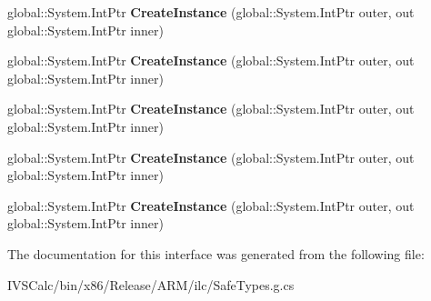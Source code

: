 \begin{DoxyCompactItemize}
\item 
\mbox{\label{interface_windows_1_1_u_i_1_1_xaml_1_1_media_1_1_animation_1_1_i_navigation_transition_info_factory_a81a98b08b53546f7b53286e123735d18}} 
global\+::\+System.\+Int\+Ptr {\bfseries Create\+Instance} (global\+::\+System.\+Int\+Ptr outer, out global\+::\+System.\+Int\+Ptr inner)
\item 
\mbox{\label{interface_windows_1_1_u_i_1_1_xaml_1_1_media_1_1_animation_1_1_i_navigation_transition_info_factory_a81a98b08b53546f7b53286e123735d18}} 
global\+::\+System.\+Int\+Ptr {\bfseries Create\+Instance} (global\+::\+System.\+Int\+Ptr outer, out global\+::\+System.\+Int\+Ptr inner)
\item 
\mbox{\label{interface_windows_1_1_u_i_1_1_xaml_1_1_media_1_1_animation_1_1_i_navigation_transition_info_factory_a81a98b08b53546f7b53286e123735d18}} 
global\+::\+System.\+Int\+Ptr {\bfseries Create\+Instance} (global\+::\+System.\+Int\+Ptr outer, out global\+::\+System.\+Int\+Ptr inner)
\item 
\mbox{\label{interface_windows_1_1_u_i_1_1_xaml_1_1_media_1_1_animation_1_1_i_navigation_transition_info_factory_a81a98b08b53546f7b53286e123735d18}} 
global\+::\+System.\+Int\+Ptr {\bfseries Create\+Instance} (global\+::\+System.\+Int\+Ptr outer, out global\+::\+System.\+Int\+Ptr inner)
\item 
\mbox{\label{interface_windows_1_1_u_i_1_1_xaml_1_1_media_1_1_animation_1_1_i_navigation_transition_info_factory_a81a98b08b53546f7b53286e123735d18}} 
global\+::\+System.\+Int\+Ptr {\bfseries Create\+Instance} (global\+::\+System.\+Int\+Ptr outer, out global\+::\+System.\+Int\+Ptr inner)
\end{DoxyCompactItemize}


The documentation for this interface was generated from the following file\+:\begin{DoxyCompactItemize}
\item 
I\+V\+S\+Calc/bin/x86/\+Release/\+A\+R\+M/ilc/Safe\+Types.\+g.\+cs\end{DoxyCompactItemize}
